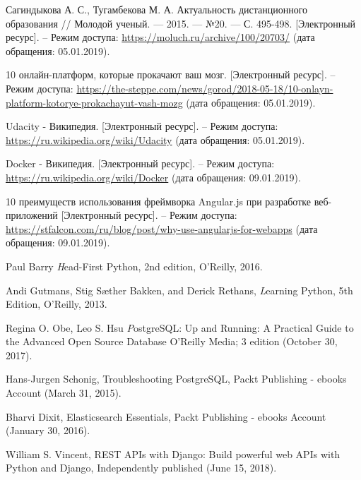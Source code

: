\begin{thebibliography}{}

Сагиндыкова А. С., Тугамбекова М. А.
Актуальность дистанционного образования // Молодой ученый. — 2015. — №20. — С. 495-498.
[Электронный ресурс]. – Режим доступа:
\href{https://moluch.ru/archive/100/20703/}{https://moluch.ru/archive/100/20703/}
(дата обращения: 05.01.2019).

  10 онлайн-платформ, которые прокачают ваш мозг.
  [Электронный ресурс]. – Режим доступа:
  \href{https://the-steppe.com/news/gorod/2018-05-18/10-onlayn-platform-kotorye-prokachayut-vash-mozg}{https://the-steppe.com/news/gorod/2018-05-18/10-onlayn-platform-kotorye-prokachayut-vash-mozg}
  (дата обращения: 05.01.2019).

  Udacity - Википедия. [Электронный ресурс]. – Режим доступа:
  \href{https://ru.wikipedia.org/wiki/Udacity}{https://ru.wikipedia.org/wiki/Udacity}
  (дата обращения: 05.01.2019).

  Docker - Википедия. [Электронный ресурс]. – Режим доступа:
  \href{https://ru.wikipedia.org/wiki/Docker}{https://ru.wikipedia.org/wiki/Docker}
  (дата обращения: 09.01.2019).

  10 преимуществ использования фреймворка Angular.js при разработке веб-приложений [Электронный ресурс]. – Режим доступа:
  \href{https://stfalcon.com/ru/blog/post/why-use-angularjs-for-webapps}{https://stfalcon.com/ru/blog/post/why-use-angularjs-for-webapps}
  (дата обращения: 09.01.2019).



\bibitem{}
  Paul Barry
  \emph Head-First Python, 2nd edition,
  O’Reilly,
  2016.

\bibitem{}
  Andi Gutmans, Stig Sæther Bakken, and Derick Rethans,
  \emph Learning Python, 5th Edition,
  O’Reilly,
  2013.

\bibitem{}
  Regina O. Obe, Leo S. Hsu
  \emph PostgreSQL: Up and Running: A Practical Guide to the Advanced Open Source Database
  O'Reilly Media; 3 edition (October 30, 2017).

\bibitem{}
  Hans-Jurgen Schonig,
  Troubleshooting PostgreSQL,
  Packt Publishing - ebooks Account (March 31, 2015).

\bibitem{}
  Bharvi Dixit,
  Elasticsearch Essentials,
  Packt Publishing - ebooks Account (January 30, 2016).

\bibitem{}
  William S. Vincent,
  REST APIs with Django: Build powerful web APIs with Python and Django,
  Independently published (June 15, 2018).


\end{thebibliography}
